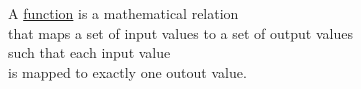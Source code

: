 \documentclass[preview]{standalone}
\begin{document}
\begin{center}
A \underline{function} is a mathematical relation \\ that maps a set of input values to a set of output values \\ such that each input value \\ is mapped to exactly one outout value.
\end{center}
\end{document}
